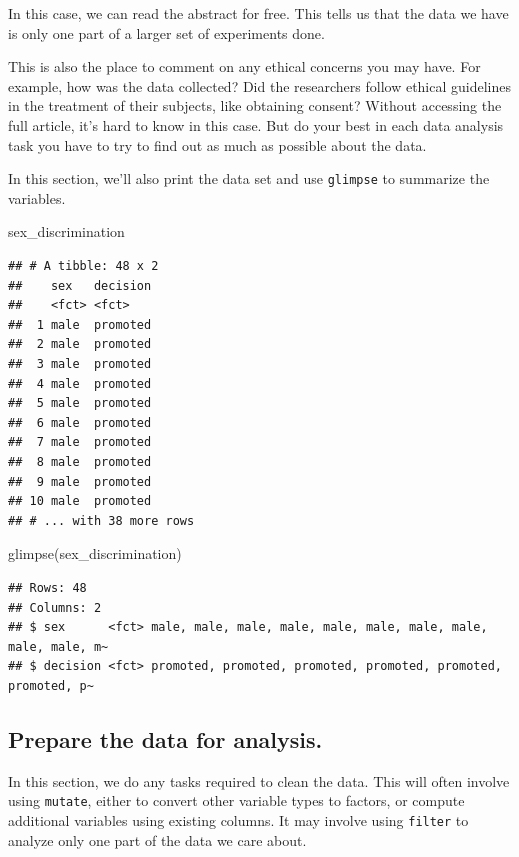 \documentclass[
]{book}
\newenvironment{Shaded}{\begin{snugshade}}{\end{snugshade}}
\newcommand{\FunctionTok}[1]{\textcolor[rgb]{0.00,0.00,0.00}{#1}}
\newcommand{\NormalTok}[1]{#1}
\begin{document}
In this case, we can read the abstract for free. This tells us that the data we have is only one part of a larger set of experiments done.

This is also the place to comment on any ethical concerns you may have. For example, how was the data collected? Did the researchers follow ethical guidelines in the treatment of their subjects, like obtaining consent? Without accessing the full article, it's hard to know in this case. But do your best in each data analysis task you have to try to find out as much as possible about the data.

In this section, we'll also print the data set and use \texttt{glimpse} to summarize the variables.

\begin{Shaded}
\begin{Highlighting}[]
\NormalTok{sex\_discrimination}
\end{Highlighting}
\end{Shaded}

\begin{verbatim}
## # A tibble: 48 x 2
##    sex   decision
##    <fct> <fct>   
##  1 male  promoted
##  2 male  promoted
##  3 male  promoted
##  4 male  promoted
##  5 male  promoted
##  6 male  promoted
##  7 male  promoted
##  8 male  promoted
##  9 male  promoted
## 10 male  promoted
## # ... with 38 more rows
\end{verbatim}

\begin{Shaded}
\begin{Highlighting}[]
\FunctionTok{glimpse}\NormalTok{(sex\_discrimination)}
\end{Highlighting}
\end{Shaded}

\begin{verbatim}
## Rows: 48
## Columns: 2
## $ sex      <fct> male, male, male, male, male, male, male, male, male, male, m~
## $ decision <fct> promoted, promoted, promoted, promoted, promoted, promoted, p~
\end{verbatim}

\hypertarget{hypothesis1-ex-prepare}{%
\subsection{Prepare the data for analysis.}\label{hypothesis1-ex-prepare}}

In this section, we do any tasks required to clean the data. This will often involve using \texttt{mutate}, either to convert other variable types to factors, or compute additional variables using existing columns. It may involve using \texttt{filter} to analyze only one part of the data we care about.
\end{document}
